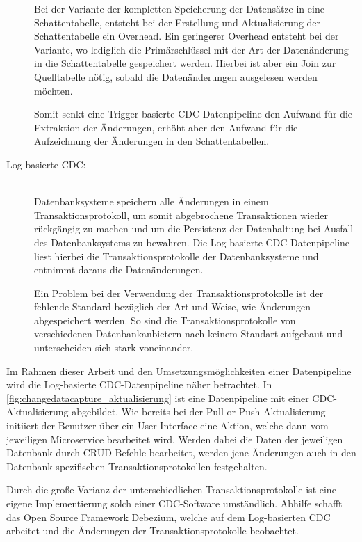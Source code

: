 \begin{description}
    Bei der Variante der kompletten Speicherung der Datensätze in eine Schattentabelle, entsteht bei der Erstellung und Aktualisierung der Schattentabelle ein Overhead. Ein geringerer Overhead entsteht bei der Variante, wo lediglich die Primärschlüssel mit der Art der Datenänderung in die Schattentabelle gespeichert werden. Hierbei ist aber ein Join zur Quelltabelle nötig, sobald die Datenänderungen ausgelesen werden möchten.

    Somit senkt eine Trigger-basierte CDC-Datenpipeline den Aufwand für die Extraktion der Änderungen, erhöht aber den Aufwand für die Aufzeichnung der Änderungen in den Schattentabellen.

    \item[Log-basierte CDC:]\hfill \\
    Datenbanksysteme speichern alle Änderungen in einem Transaktionsprotokoll, um somit abgebrochene Transaktionen wieder rückgängig zu machen und um die Persistenz der Datenhaltung bei Ausfall des Datenbanksystems zu bewahren. Die Log-basierte CDC-Datenpipeline liest hierbei die Transaktionsprotokolle der Datenbanksysteme und entnimmt daraus die Datenänderungen.

    Ein Problem bei der Verwendung der Transaktionsprotokolle ist der fehlende Standard bezüglich der Art und Weise, wie Änderungen abgespeichert werden. So sind die Transaktionsprotokolle von verschiedenen Datenbankanbietern nach keinem Standart aufgebaut und unterscheiden sich stark voneinander.

\end{description}

Im Rahmen dieser Arbeit und den Umsetzungsmöglichkeiten einer Datenpipeline wird die Log-basierte CDC-Datenpipeline näher betrachtet. In \autoref{fig:changedatacapture_aktualisierung} ist eine Datenpipeline mit einer CDC-Aktualisierung abgebildet. Wie bereits bei der Pull-or-Push Aktualisierung initiiert der Benutzer über ein User Interface eine Aktion, welche dann vom jeweiligen Microservice bearbeitet wird. Werden dabei die Daten der jeweiligen Datenbank durch CRUD-Befehle bearbeitet, werden jene Änderungen auch in den Datenbank-spezifischen Transaktionsprotokollen festgehalten.

Durch die große Varianz der unterschiedlichen Transaktionsprotokolle ist eine eigene Implementierung solch einer CDC-Software umständlich. Abhilfe schafft das Open Source Framework \glqq Debezium\grqq{}, welche auf dem Log-basierten CDC arbeitet und die Änderungen der Transaktionsprotokolle beobachtet.

